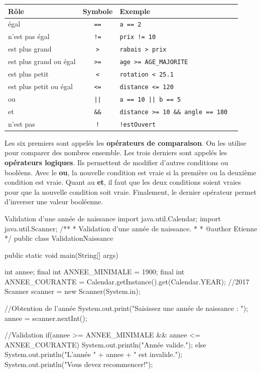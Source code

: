 \documentclass[12pt]{report}
\begin{document}
\begin{center}
\renewcommand{\arraystretch}{1.5}
	\begin{tabularx}{0.8\linewidth}{l c X X} \toprule
		\textbf{Rôle} & \textbf{Symbole} & \textbf{Exemple} \\ \midrule
		égal & \texttt{==} & \texttt{a == 2} \\
		n'est pas égal & \texttt{!=} & \texttt{prix != 10} \\
		est plus grand & \texttt{>} & \texttt{rabais > prix} \\
		est plus grand ou égal & \texttt{>=} & \texttt{age >= AGE\_MAJORITE} \\
		est plus petit & \texttt{<} & \texttt{rotation < 25.1} \\
		est plus petit ou égal & \texttt{<=} & \texttt{distance <= 120} \\
		ou & \texttt{||} & \texttt{a == 10 || b == 5} \\
		et & \texttt{\&\&} & \texttt{distance >= 10 \&\& angle == 180} \\
		n'est pas & \texttt{!} & \texttt{!estOuvert} \\ \bottomrule
	\end{tabularx}
\end{center}

Les six premiers sont appelés les \textbf{opérateurs de comparaison}. On les utilise pour comparer des nombres ensemble. Les trois derniers sont appelés les \textbf{opérateurs logiques}. Ils permettent de modifier d'autres conditions ou booléens. Avec le \textbf{ou}, la nouvelle condition est vraie si la première ou la deuxième condition est vraie. Quant au \textbf{et}, il faut que les deux conditions soient vraies pour que la nouvelle condition soit vraie. Finalement, le dernier opérateur permet d'inverser une valeur booléenne. 


\begin{MyTCB}{Validation d'une année de naissance}
import java.util.Calendar;
import java.util.Scanner;
/**
 * Validation d'une année de naissance.
 * 
 * @author Etienne
 */
public class ValidationNaissance {

	public static void main(String[] args) {
		
		int annee;
		final int ANNEE_MINIMALE = 1900;
		final int ANNEE_COURANTE = Calendar.getInstance().get(Calendar.YEAR); //2017
		Scanner scanner = new Scanner(System.in);
		
		
		//Obtention de l'année
		System.out.print("Saisissez une année de naissance : ");
		annee = scanner.nextInt();
		
		
		//Validation
		if(annee >= ANNEE_MINIMALE && annee <= ANNEE_COURANTE) {
			System.out.println("Année valide.");
		}
		else {
			System.out.println("L'année " + annee + " est invalide.");
			System.out.println("Vous devez recommencer!");
		}

	}

}
\end{MyTCB}
\end{document}
